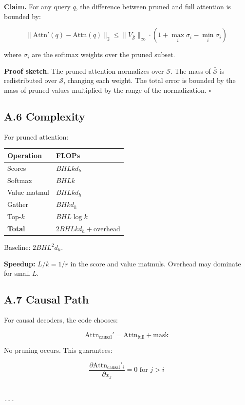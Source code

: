 \textbf{Claim.} For any query $q$, the difference between pruned and full attention is bounded by:

\[
\|\text{Attn}'(q) - \text{Attn}(q)\|_2 \leq \|V_{\bar{\mathcal{S}}}\|_\infty \cdot \left(1 + \max_i \sigma_i - \min_i \sigma_i\right)
\tag{A.6}
\]

where $\sigma_i$ are the softmax weights over the pruned subset.

\textbf{Proof sketch.} The pruned attention normalizes over $\mathcal{S}$. The 
mass of $\bar{\mathcal{S}}$ is redistributed over $\mathcal{S}$, changing 
each weight. The total error is bounded by the mass of pruned values 
multiplied by the range of the normalization. $\square$

\subsection{A.6 Complexity}

For pruned attention:

\begin{table}[H]
\centering
\small
\begin{tabular}{ll}
\toprule
\textbf{Operation} & \textbf{FLOPs} \\
\midrule
Scores & $B H L k d_h$ \\
Softmax & $B H L k$ \\
Value matmul & $B H L k d_h$ \\
Gather & $B H k d_h$ \\
Top-$k$ & $B H L \log k$ \\
\textbf{Total} & $2 B H L k d_h + \text{overhead}$ \\
\bottomrule
\end{tabular}
\end{table}

Baseline: $2 B H L^2 d_h$.

\textbf{Speedup:} $L/k = 1/r$ in the score and value matmuls. Overhead may 
dominate for small $L$.

\subsection{A.7 Causal Path}

For causal decoders, the code chooses:

\[
\text{Attn}_\text{causal}' = \text{Attn}_\text{full} + \text{mask}
\tag{A.7}
\]

No pruning occurs. This guarantees:

\[
\frac{\partial \text{Attn}_\text{causal}'_i}{\partial x_j} = 0 \text{ for } j > i
\tag{A.8}
\]
\begin{lstlisting}

---
\end{lstlisting}
